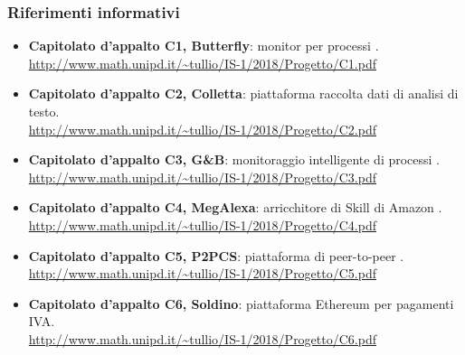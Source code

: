         \subsubsection{Riferimenti informativi}
            \begin{itemize}
                \item \textbf{Capitolato d'appalto C1, Butterfly}:
                    monitor per processi . \\
                    \url{http://www.math.unipd.it/~tullio/IS-1/2018/Progetto/C1.pdf}
                \item \textbf{Capitolato d'appalto C2, Colletta}:
                    piattaforma raccolta dati di analisi di testo. \\
                    \url{http://www.math.unipd.it/~tullio/IS-1/2018/Progetto/C2.pdf}
                \item \textbf{Capitolato d'appalto C3, G\&B}:
                    monitoraggio intelligente di processi . \\
                    \url{http://www.math.unipd.it/~tullio/IS-1/2018/Progetto/C3.pdf}
                \item \textbf{Capitolato d'appalto C4, MegAlexa}:
                    arricchitore di Skill di Amazon . \\
                    \url{http://www.math.unipd.it/~tullio/IS-1/2018/Progetto/C4.pdf}
                \item \textbf{Capitolato d'appalto C5, P2PCS}:
                    piattaforma di peer-to-peer . \\
                    \url{http://www.math.unipd.it/~tullio/IS-1/2018/Progetto/C5.pdf}
                \item \textbf{Capitolato d'appalto C6, Soldino}:
                    piattaforma Ethereum per pagamenti IVA. \\
                    \url{http://www.math.unipd.it/~tullio/IS-1/2018/Progetto/C6.pdf}
            \end{itemize}
